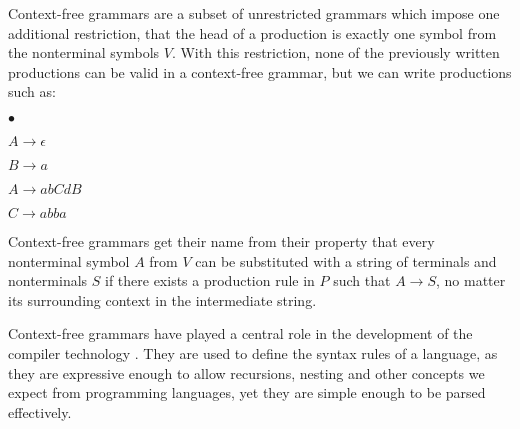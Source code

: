 Context-free grammars are a subset of unrestricted grammars which impose one additional restriction, that the head of a production is exactly one symbol from the nonterminal symbols $V$. With this restriction, none of the previously written productions can be valid in a context-free grammar, but we can write productions such as:
\begin{list}{$\bullet$}{}  	
	\item $A \rightarrow \epsilon$
	\item $B \rightarrow a$
	\item $A \rightarrow abCdB$
	\item $C \rightarrow abba$
\end{list}

Context-free grammars get their name from their property that every nonterminal symbol $A$ from $V$ can be substituted with a string of terminals and nonterminals $S$ if there exists a production rule in $P$ such that $A \rightarrow S$, no matter its surrounding context in the intermediate string.

Context-free grammars have played a central role in the development of the compiler technology \citep{hopcroft2007automatatheory}. They are used to define the syntax rules of a language, as they are expressive enough to allow recursions, nesting and other concepts we expect from programming languages, yet they are simple enough to be parsed effectively.